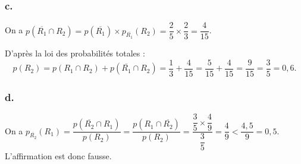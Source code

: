 	\subsubsection*{c.}
	
	On a \(p(\overline{R_1} \cap R_2) = p(\overline{R_1}) \times p_{\overline{R_1}}(R_2) = \dfrac{2}{5} \times \dfrac{2}{3} = \dfrac{4}{15}\).
	
	D'après la loi des probabilités totales :
	\[
	p(R_2) = p(R_1 \cap R_2) + p(\overline{R_1} \cap R_2) = \dfrac{1}{3} + \dfrac{4}{15} = \dfrac{5}{15} + \dfrac{4}{15} = \dfrac{9}{15} = \dfrac{3}{5} = 0,6.
	\]
	
	\subsubsection*{d.}
	
	On a \(p_{\overline{R_2}}(R_1) = \dfrac{p(\overline{R_2} \cap R_1)}{p(R_2)} = \dfrac{p(R_1 \cap \overline{R_2})}{p(R_2)} = \dfrac{\dfrac{3}{5} \times \dfrac{4}{9}}{\dfrac{3}{5}} = \dfrac{4}{9} < \dfrac{4,5}{9} = 0,5\).\\
	 L'affirmation est donc fausse.
